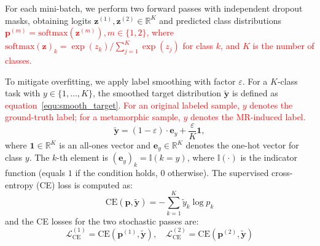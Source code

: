 \documentclass[lettersize,journal]{IEEEtran}
\newcommand{\red}[1]{\textcolor{red}{#1}}
\newif\ifshowcmt
\newcommand{\cmt}[1]{%
	\ifshowcmt
	\textcolor{blue}{/* #1 */}%
	\fi
}
\begin{document}
For each mini-batch, we perform two forward passes with independent dropout masks, obtaining logits $\mathbf{z}^{(1)}, \mathbf{z}^{(2)} \in \mathbb{R}^{K}$ and predicted class distributions \red{$\mathbf{p}^{(m)}=\mathrm{softmax}(\mathbf{z}^{(m)}), m\in\{1,2\}$, where $\mathrm{softmax}(\mathbf{z})_k=\exp(z_k)/\sum_{j=1}^{K}\exp(z_j)$ for class $k$, and $K$ is the number of classes.} %

To mitigate overfitting, we apply label smoothing with factor $\varepsilon$. For a $K$-class task with $y \in \{1, \dots, K\}$, the smoothed target distribution $\tilde{\mathbf{y}}$ is defined as \red{equation~\ref{equ:smooth_target}. For an original labeled sample, $y$ denotes the ground-truth label; for a metamorphic sample, $y$ denotes the MR-induced label.}
\begin{equation}
	\label{equ:smooth_target}
	\tilde{\mathbf{y}} = (1-\varepsilon) \cdot \mathbf{e}_{y} + \frac{\varepsilon}{K}\mathbf{1},
\end{equation}
where $\mathbf{1} \in \mathbb{R}^{K}$ is an all-ones vector and $\mathbf{e}_{y} \in \mathbb{R}^{K}$ denotes the one-hot vector for class $y$. The $k$-th element is $(\mathbf{e}_{y})_{k} = \mathbb{I}(k=y)$, where $\mathbb{I}(\cdot)$ is the indicator function (equals $1$ if the condition holds, $0$ otherwise).
The supervised cross-entropy (CE) loss is computed as:
\begin{equation}
	\label{equ:CE_def}
	\mathrm{CE}(\mathbf{p}, \tilde{\mathbf{y}}) = -\sum_{k=1}^{K}\tilde{y}_{k}\log p_{k}
\end{equation}
and the CE losses for the two stochastic passes are:
\begin{equation}
	\label{equ:CE}
	\mathcal{L}_{\mathrm{CE}}^{(1)} = \mathrm{CE}(\mathbf{p}^{(1)}, \tilde{\mathbf{y}}), \quad
	\mathcal{L}_{\mathrm{CE}}^{(2)} = \mathrm{CE}(\mathbf{p}^{(2)}, \tilde{\mathbf{y}})
\end{equation}
\end{document}
